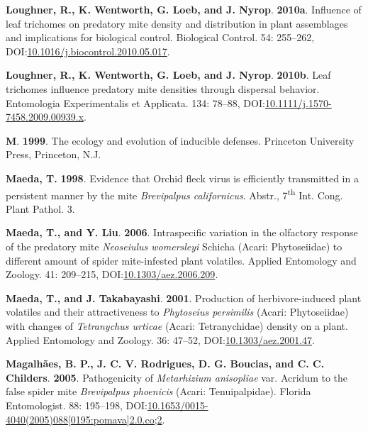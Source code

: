\documentclass[12pt,final,CPage]{ufthesis}
\newlength{\cslhangindent}
\newenvironment{CSLReferences}[2] %
{%
	\setlength{\parindent}{0pt}
	\ifodd #1 \everypar{\setlength{\hangindent}{\cslhangindent}}\ignorespaces\fi
	\ifnum #2 > 0
	\setlength{\parskip}{#2\baselineskip}
	\fi
}%
{}
\begin{document}
{\begin{CSLReferences}{1}{0}
  \leavevmode{}%
  \textbf{Loughner, R., K. Wentworth, G. Loeb, and J. Nyrop}. \textbf{2010a}. Influence of leaf trichomes on predatory mite density and distribution in plant assemblages and implications for biological control. Biological Control. 54: 255--262, DOI:\href{https://doi.org/10.1016/j.biocontrol.2010.05.017}{10.1016/j.biocontrol.2010.05.017}.

  \leavevmode{}%
  \textbf{Loughner, R., K. Wentworth, G. Loeb, and J. Nyrop}. \textbf{2010b}. Leaf trichomes influence predatory mite densities through dispersal behavior. Entomologia Experimentalis et Applicata. 134: 78--88, DOI:\href{https://doi.org/10.1111/j.1570-7458.2009.00939.x}{10.1111/j.1570-7458.2009.00939.x}.

  \leavevmode{}%
  \textbf{M}. \textbf{1999}. The ecology and evolution of inducible defenses. Princeton University Press, Princeton, N.J.

  \leavevmode{}%
  \textbf{Maeda, T.} \textbf{1998}. Evidence that {Orchid fleck virus} is efficiently transmitted in a persistent manner by the mite {\emph{Brevipalpus californicus}}. Abstr., 7\textsuperscript{th} Int. Cong. Plant Pathol. 3.

  \leavevmode{}%
  \textbf{Maeda, T., and Y. Liu}. \textbf{2006}. Intraspecific variation in the olfactory response of the predatory mite {\emph{Neoseiulus womersleyi}} {Schicha} {({Acari}: {Phytoseiidae})} to different amount of spider mite-infested plant volatiles. Applied Entomology and Zoology. 41: 209--215, DOI:\href{https://doi.org/10.1303/aez.2006.209}{10.1303/aez.2006.209}.

  \leavevmode{}%
  \textbf{Maeda, T., and J. Takabayashi}. \textbf{2001}. Production of herbivore-induced plant volatiles and their attractiveness to {\emph{Phytoseius persimilis}} {({Acari}: {Phytoseiidae})} with changes of {\emph{Tetranychus urticae}} {({Acari}: Tetranychidae)} density on a plant. Applied Entomology and Zoology. 36: 47--52, DOI:\href{https://doi.org/10.1303/aez.2001.47}{10.1303/aez.2001.47}.

  \leavevmode{}%
  \textbf{Magalhães, B. P., J. C. V. Rodrigues, D. G. Boucias, and C. C. Childers}. \textbf{2005}. Pathogenicity of {\emph{Metarhizium anisopliae}} var. Acridum to the false spider mite {\emph{Brevipalpus phoenicis}} ({Acari}: {Tenuipalpidae}). Florida Entomologist. 88: 195--198, DOI:\href{https://doi.org/10.1653/0015-4040(2005)088\%5B0195:pomava\%5D2.0.co;2}{10.1653/0015-4040(2005)088{[}0195:pomava{]}2.0.co;2}.


\end{CSLReferences}}
\end{document}
